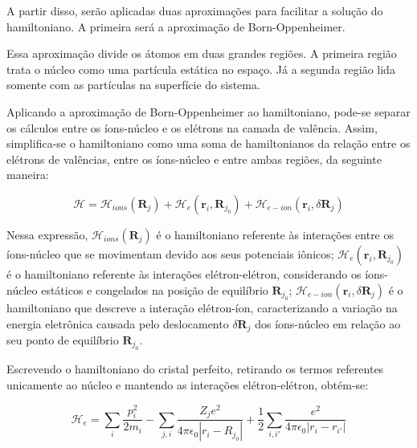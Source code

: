       \par A partir disso, serão aplicadas duas aproximações para facilitar a solução do hamiltoniano. A primeira será a aproximação de Born-Oppenheimer.\cite{qm_fis9}


      \par Essa aproximação divide os átomos em duas grandes regiões. A primeira região trata o núcleo como uma partícula estática no espaço. Já a segunda região lida somente com as partículas na superfície do sistema.

      \par Aplicando a aproximação de Born-Oppenheimer ao hamiltoniano, pode-se separar os cálculos entre os íons-núcleo e os elétrons na camada de valência. Assim, simplifica-se o hamiltoniano como uma soma de hamiltonianos da relação entre os elétrons de valências, entre os íons-núcleo e entre ambas regiões, da seguinte maneira:

      \begin{equation}\label{eq_schrodinger_eq5}
        \mathcal{H} = 
          \mathcal{H}_{ions} (\mathbf{R}_{j}) 
          + \mathcal{H}_{e}(\mathbf{r}_{i}, \mathbf{R}_{j_{0}})
          + \mathcal{H}_{e-ion}(\mathbf{r}_i, \delta\mathbf{R}_j)
      \end{equation}

      \par Nessa expressão, $\mathcal{H}_{ions}(\mathbf{R}_{j})$ é o hamiltoniano referente às interações entre os íons-núcleo que se movimentam devido aos seus potenciais iônicos; $\mathcal{H}_{e}(\mathbf{r}_{i},\mathbf{R}_{j_{0}})$ é o hamiltoniano referente às interações elétron-elétron, considerando os íons-núcleo estáticos e congelados na posição de equilíbrio $\mathbf{R}_{j_{0}}$; $\mathcal{H}_{e-ion}(\mathbf{r}_{i},\delta\mathbf{R}_{j})$ é o hamiltoniano que descreve a interação elétron-íon, caracterizando a variação na energia eletrônica causada pelo deslocamento $\delta\mathbf{R}_{j}$ dos íons-núcleo em relação ao seu ponto de equilíbrio $\mathbf{R}_{j_{0}}$.
      
      \par Escrevendo o hamiltoniano do cristal perfeito, retirando os termos referentes unicamente ao núcleo e mantendo as interações elétron-elétron, obtém-se:

      \begin{equation}\label{eq_schrodinger_eq6}
        \mathcal{H}_{e} = 
          \sum_{i} \frac{p_{i}^2}{2m_{i}} 
          -  \sum_{j, i} \frac{Z_{j} e^2}{4\pi\epsilon_{0}\left|r_{i} - R_{j_{0}}\right|} 
          + \frac{1}{2} \sum_{i, i'} \frac{e^2}{4\pi\epsilon_{0}\left|r_{i} - r_{i'}\right|}
      \end{equation}

